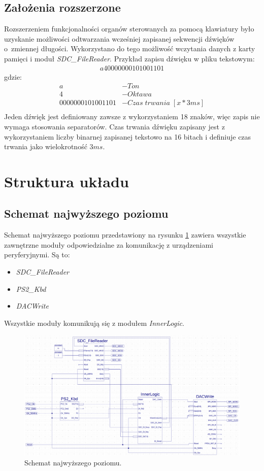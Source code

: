 \documentclass[12pt]{article}
\begin{document}
\subsection{Założenia rozszerzone}

Rozszerzeniem funkcjonalności organów sterowanych za pomocą klawiatury było uzyskanie możliwości odtwarzania wcześniej zapisanej sekwencji dźwięków o~zmiennej długości. Wykorzystano do tego możliwość wczytania danych z karty pamięci i moduł \textit{SDC\_FileReader}.
Przykład zapisu dźwięku w pliku tekstowym:
\begin{align*}
  a40000000101001101
\end{align*}
gdzie:
\begin{align*}
  a                & - Ton                    \\
  4                & - Oktawa                 \\
  0000000101001101 & - Czas\;trwania\;[x*3ms] \\
\end{align*}
Jeden dźwięk jest definiowany zawsze z wykorzystaniem 18 znaków, więc zapis nie wymaga stosowania separatorów. Czas trwania dźwięku zapisany jest z wykorzystaniem liczby binarnej zapisanej tekstowo na 16 bitach i definiuje czas trwania jako wielokrotność $3ms$.

\section{Struktura układu}
\subsection{Schemat najwyższego poziomu}
Schemat najwyższego poziomu przedstawiony na rysunku \ref{sch:main} zawiera wszystkie zawnętrzne moduły odpowiedzialne za komunikację z urządzeniami peryferyjnymi. Są to:
\begin{itemize}[noitemsep]
  \item \textit{SDC\_FileReader}
  \item \textit{PS2\_Kbd}
  \item \textit{DACWrite}
\end{itemize}
Wszystkie moduły komunikują się z modułem \textit{InnerLogic}.


\begin{figure}[h]
  \centering
  \includegraphics[width=\linewidth]{images/main}
  \caption{Schemat najwyższego poziomu.}
  \label{sch:main}
\end{figure}
\end{document}

